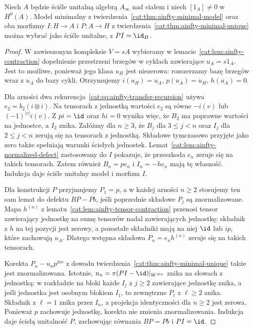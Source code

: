 \begin{twierdzenie}\label{cat:thm:ainfty-strict-unit-transfer}
Niech $A$ będzie ściśle unitalną algebrą $A_\infty$ nad ciałem i niech $[1_A]\neq0$ w $H^0(A)$. Model minimalny z twierdzenia~\ref{cat:thm:ainfty-minimal-model} oraz oba morfizmy $I:H\to A$ i $P:A\to H$ z twierdzenia~\ref{cat:thm:ainfty-minimal-unique} można wybrać jako ściśle unitalne, z $PI=\id_H$.
\end{twierdzenie}
\begin{proof}
W zawieszonym kompleksie $V=sA$ wybieramy w lemacie~\ref{cat:lem:ainfty-contraction} dopełnienie przestrzeni brzegów w cyklach zawierające $u_A=s1_A$. Jest to możliwe, ponieważ jego klasa $u_H$ jest niezerowa: rozszerzamy bazę brzegów wraz z $u_A$ do bazy cykli. Otrzymujemy $i(u_H)=u_A$, $p(u_A)=u_H$, $h(u_A)=0$.

Dla arności dwa rekurencja~\eqref{cat:eq:ainfty-transfer-recursion} używa $e_2=b_2(i\otimes i)$. Na tensorach z jednostką wartości $e_2$ są równe $-i(v)$ lub $(-1)^{|v|}i(v)$. Z $pi=\id$ oraz $hi=0$ wynika więc, że $B_2$ ma poprawne wartości na jednostce, a $I_2$ znika. Załóżmy dla $n\geq3$, że $B_j$ dla $3\leq j<n$ oraz $I_j$ dla $2\leq j<n$ zerują się na tensorach z jednostką. Składowe tymczasowo przyjęte jako zero także spełniają warunki ścisłych jednostek. Lemat~\ref{cat:lem:ainfty-normalized-defect} zastosowany do $I$ pokazuje, że przeszkoda $e_n$ zeruje się na takich tensorach. Zatem również $B_n=pe_n$ i $I_n=-he_n$ mają tę własność. Indukcja daje ściśle unitalny model i morfizm $I$.

Dla konstrukcji $P$ przyjmujemy $P_1=p$, a w każdej arności $n\geq2$ stosujemy ten sam lemat do defektu $BP-Pb$, jeśli poprzednie składowe $P_j$ są znormalizowane. Mapa $h^{(n)}$ z lematu~\ref{cat:lem:ainfty-tensor-contraction} przenosi tensor zawierający jednostkę na sumę tensorów nadal zawierających jednostkę: składnik z $h$ na tej pozycji jest zerowy, a pozostałe składniki mają na niej $\id$ lub $ip$, które zachowują $u_A$. Dlatego wstępna składowa $P_n=e_n h^{(n)}$ zeruje się na takich tensorach.

Korekta $P_n-u_n p^{\otimes n}$ z dowodu twierdzenia~\ref{cat:thm:ainfty-minimal-unique} także jest znormalizowana. Istotnie, $u_n=\pi(PI-\id)|_{W^{\otimes n}}$ znika na słowach z jednostką: w rozkładzie na bloki każde $I_j$ z $j\geq2$ zawierające jednostkę znika, a jeśli jednostka jest osobnym blokiem $I_1$, to zewnętrzne $P_\ell$ z $\ell\geq2$ znika. Składnik z $\ell=1$ znika przez $I_n$, a projekcja identyczności dla $n\geq2$ jest zerowa. Ponieważ $p$ zachowuje jednostkę, korekta nie zmienia znormalizowania. Indukcja daje ścisłą unitalność $P$, zachowując równania $BP=Pb$ i $PI=\id$.
\end{proof}

